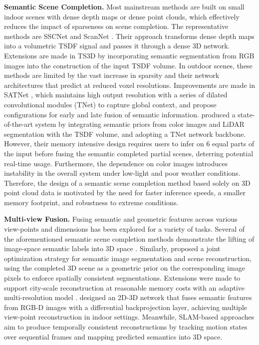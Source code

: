 \documentclass{article}
\begin{document}
\textbf{Semantic Scene Completion.} Most mainstream methods are built on small indoor scenes with dense depth maps or dense point clouds, which effectively reduces the impact of sparseness on scene completion. The representative methods are SSCNet \cite{song2017semantic} and ScanNet \cite{dai2017scannet}. Their approach transforms dense depth maps into a volumetric TSDF signal and passes it through a dense 3D network. Extensions are made in TS3D \cite{garbade2019two} by incorporating semantic segmentation from RGB images into the construction of the input TSDF volume. In outdoor scenes, these methods are limited by the vast increase in sparsity and their network architectures that predict at reduced voxel resolutions. Improvements are made in SATNet \cite{liu2018see}, which maintains high output resolution with a series of dilated convolutional modules (TNet) to capture global context, and propose configurations for early and late fusion of semantic information. \citet{behley2019semantickitti} produced a state-of-the-art system by integrating semantic priors from color images and LiDAR segmentation with the TSDF volume, and adopting a TNet network backbone. However, their memory intensive design requires users to infer on 6 equal parts of the input before fusing the semantic completed partial scenes, deterring potential real-time usage. Furthermore, the dependence on color images introduces instability in the overall system under low-light and poor weather conditions. Therefore, the design of a semantic scene completion method based solely on 3D point cloud data is motivated by the need for faster inference speeds, a smaller memory footprint, and robustness to extreme conditions.




\textbf{Multi-view Fusion.} Fusing semantic and geometric features across various view-points and dimensions has been explored for a variety of tasks. Several of the aforementioned semantic scene completion methods demonstrate the lifting of image-space semantic labels into 3D space \cite{garbade2019two,liu2018see}. Similarly, \citet{hane2013joint} proposed a joint optimization strategy for semantic image segmentation and scene reconstruction, using the completed 3D scene as a geometric prior on the corresponding image pixels to enforce spatially consistent segmentations. Extensions were made to support city-scale reconstruction at reasonable memory costs with an adaptive multi-resolution model \cite{blaha2016large}. \citet{dai20183dmv} designed an 2D-3D network that fuses semantic features from RGB-D images with a differential backprojection layer, achieving multiple view-point reconstruction in indoor settings. Meanwhile, SLAM-based approaches \cite{tateno20162} aim to produce temporally consistent reconstructions by tracking motion states over sequential frames and mapping predicted semantics into 3D space.
\end{document}
